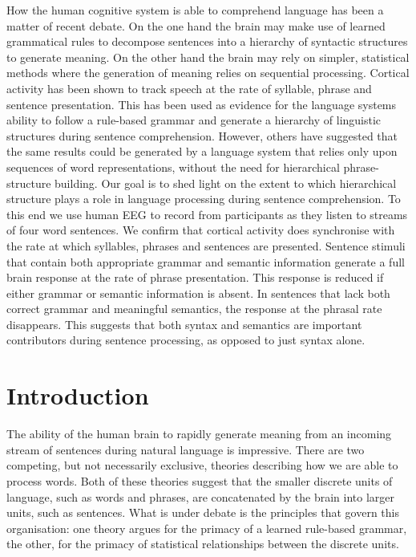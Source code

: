 \documentclass[10pt,letterpaper]{article}
\begin{document}
How the human cognitive system is able to comprehend language has been
a matter of recent debate. 
%
%
On the one hand the brain may make use of
learned grammatical rules to decompose sentences into a hierarchy of
syntactic structures to generate meaning. On the other hand the brain
may rely on simpler, statistical methods where the generation of
meaning relies on sequential processing. 
%
%
Cortical activity has been
shown to track speech at the rate of syllable, phrase and sentence
presentation. This has been used as evidence for the language systems
ability to follow a rule-based grammar and generate a hierarchy of
linguistic structures during sentence comprehension. 
%
%
However, others
have suggested that the same results could be generated by a language
system that relies only upon sequences of word representations,
without the need for hierarchical phrase-structure building. 
%
%
Our goal
is to shed light on the extent to which hierarchical structure plays a
role in language processing during sentence comprehension. To this end
we use human EEG to record from participants as they listen to streams
of four word sentences. 
%
%
We confirm that cortical activity does
synchronise with the rate at which syllables, phrases and sentences
are presented. 
%
%
Sentence stimuli that contain both appropriate grammar
and semantic information generate a full brain response at the rate of
phrase presentation. This response is reduced if either grammar or
semantic information is absent. In sentences that lack both correct
grammar and meaningful semantics, the response at the phrasal rate
disappears. 
%
%
This suggests that both syntax and semantics are important
contributors during sentence processing, as opposed to just syntax
alone. 
%

\section*{Introduction}



The ability of the human brain to rapidly generate meaning from an
incoming stream of sentences during natural language is
impressive. There are two competing, but not necessarily exclusive, theories describing how we are able to process words. Both
of these theories suggest that the smaller discrete units of language,
such as words and phrases, are concatenated by the brain into larger
units, such as sentences. What is under debate is the principles that
govern this organisation: one theory argues for the primacy of a
learned rule-based grammar, the other, for the primacy of statistical
relationships between the discrete units.
\end{document}
